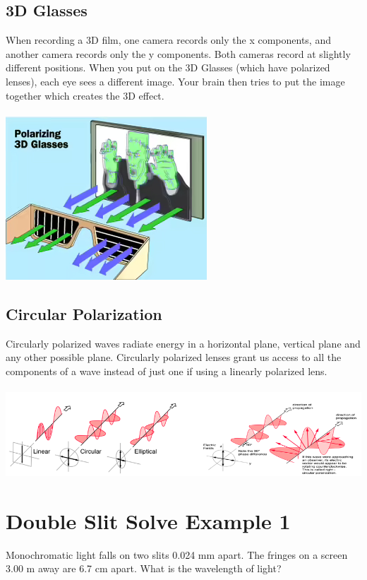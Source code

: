 \documentclass{article}
\begin{document}
\subsection{3D Glasses}
When recording a 3D film, one camera records only the x components, and another camera records only the y components. Both cameras record at slightly different positions.
When you put on the 3D Glasses (which have polarized lenses), each eye sees a different image. Your brain then tries to put the image together which creates the 3D effect.\\\\
\includegraphics[scale=0.35]{images/3d_glasses} \\

\subsection{Circular Polarization}
Circularly polarized waves radiate energy in a horizontal plane, vertical plane and any other possible plane. Circularly polarized lenses grant us access to all the components of a wave instead of just one if using a linearly polarized lens.\\\\
\includegraphics[scale=0.5]{images/circular_polarization}\\

\section{Double Slit Solve Example 1}
Monochromatic light falls on two slits 0.024 mm apart. The fringes on a screen 3.00 m away are 6.7 cm apart. What is the wavelength of light?
\end{document}
